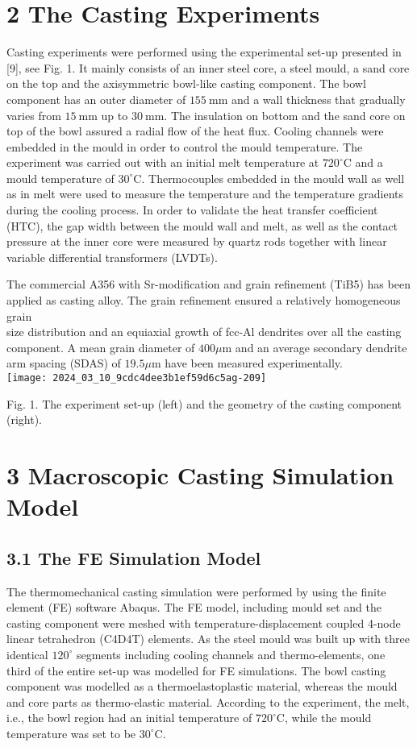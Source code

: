 \documentclass[10pt]{article}
\begin{document}
\section*{2 The Casting Experiments}
Casting experiments were performed using the experimental set-up presented in [9], see Fig. 1. It mainly consists of an inner steel core, a steel mould, a sand core on the top and the axisymmetric bowl-like casting component. The bowl component has an outer diameter of $155 \mathrm{~mm}$ and a wall thickness that gradually varies from $15 \mathrm{~mm}$ up to $30 \mathrm{~mm}$. The insulation on bottom and the sand core on top of the bowl assured a radial flow of the heat flux. Cooling channels were embedded in the mould in order to control the mould temperature. The experiment was carried out with an initial melt temperature at $720^{\circ} \mathrm{C}$ and a mould temperature of $30^{\circ} \mathrm{C}$. Thermocouples embedded in the mould wall as well as in melt were used to measure the temperature and the temperature gradients during the cooling process. In order to validate the heat transfer coefficient (HTC), the gap width between the mould wall and melt, as well as the contact pressure at the inner core were measured by quartz rods together with linear variable differential transformers (LVDTs).

The commercial A356 with Sr-modification and grain refinement (TiB5) has been applied as casting alloy. The grain refinement ensured a relatively homogeneous grain\\
size distribution and an equiaxial growth of fcc-Al dendrites over all the casting component. A mean grain diameter of $400 \mu \mathrm{m}$ and an average secondary dendrite arm spacing (SDAS) of $19.5 \mu \mathrm{m}$ have been measured experimentally.\\
\texttt{[image: 2024\_03\_10\_9cdc4dee3b1ef59d6c5ag-209]}

Fig. 1. The experiment set-up (left) and the geometry of the casting component (right).

\section*{3 Macroscopic Casting Simulation Model}
\subsection*{3.1 The FE Simulation Model}
The thermomechanical casting simulation were performed by using the finite element (FE) software Abaqus. The FE model, including mould set and the casting component were meshed with temperature-displacement coupled 4-node linear tetrahedron (C4D4T) elements. As the steel mould was built up with three identical $120^{\circ}$ segments including cooling channels and thermo-elements, one third of the entire set-up was modelled for FE simulations. The bowl casting component was modelled as a thermoelastoplastic material, whereas the mould and core parts as thermo-elastic material. According to the experiment, the melt, i.e., the bowl region had an initial temperature of $720^{\circ} \mathrm{C}$, while the mould temperature was set to be $30^{\circ} \mathrm{C}$.
\end{document}
